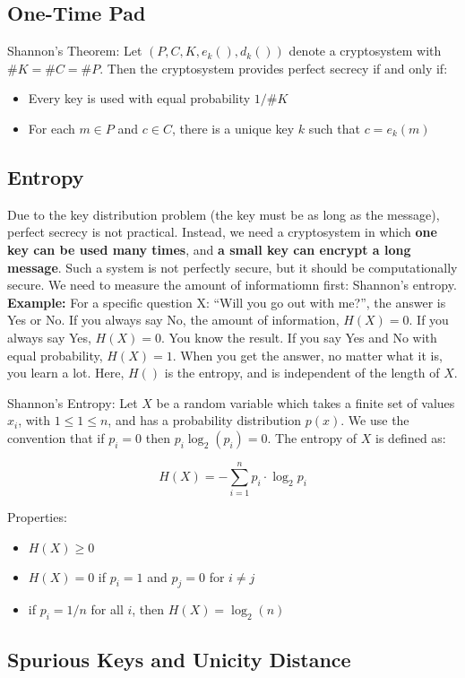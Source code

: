 \subsection{One-Time Pad}

\begin{thm}
    Shannon's Theorem: Let $(P, C, K, e_k(), d_k())$ denote a cryptosystem with \( \#K = \#C = \#P\). Then the cryptosystem provides perfect secrecy if and only if:
    \begin{itemize}
        \item Every key is used with equal probability $1/\#K$
        \item For each $m \in P$ and $c \in C$, there is a unique key $k$ such that $c = e_k(m)$
    \end{itemize}
\end{thm}


\subsection{Entropy}
Due to the key distribution problem (the key must be as long as the message), perfect secrecy is not practical. Instead, we need a cryptosystem in which \textbf{one key can be used many times}, and \textbf{a  small key can encrypt a long message}. Such a system is not perfectly secure, but it should be computationally secure. We need to measure the amount of informatiomn first: Shannon's entropy. \\

\textbf{Example:} For a specific question X: ``Will you go out with me?'', the answer is Yes or No. If you always say No, the amount of information, $H(X) = 0$. If you always say Yes, $H(X) = 0$. You know the result. If you say Yes and No with equal probability, $H(X) = 1$. When you get the answer, no matter what it is, you learn a lot. Here, $H()$ is the entropy, and is independent of the length of $X$.

\begin{defn}
    Shannon's Entropy: Let $X$ be a random variable which takes a finite set of values $x_i$, with $1 \leq 1 \leq n$, and has a probability distribution $p(x)$. We use the convention that if $p_i = 0$ then $p_i \log_2(p_i) = 0$. The entropy of $X$ is defined as:

    \[ H(X) = -\sum_{i=1}^n p_i \cdot \log_2 p_i\] 

    Properties:
    \begin{itemize}
        \item $H(X) \geq 0$
        \item $H(X) = 0$ if $p_i = 1$ and $p_j = 0$ for $i \neq j$
        \item if $p_i = 1/n$ for all $i$, then $H(X) = \log_2(n)$
    \end{itemize}
\end{defn}

\subsection{Spurious Keys and Unicity Distance}
